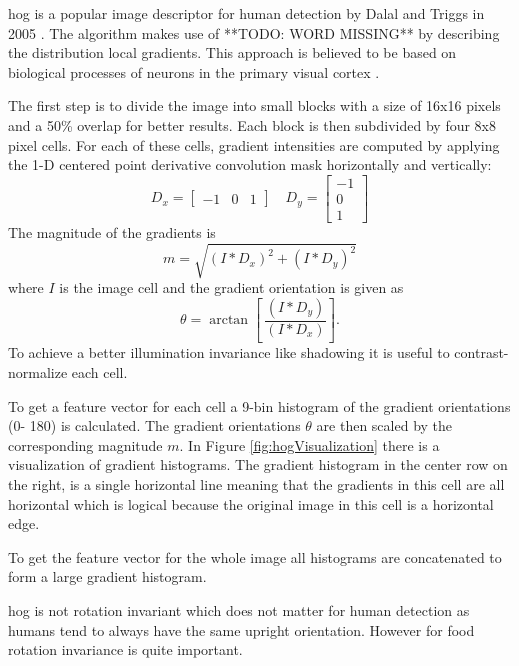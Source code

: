 \acrfull{hog} is a popular image descriptor for human detection by Dalal and Triggs in 2005 \cite{Dalal2005}. The algorithm makes use of **TODO: WORD MISSING** by describing the distribution local gradients. This approach is believed to be based on biological processes of neurons in the primary visual cortex \cite{Lowe2004}.

The first step is to divide the image into small blocks with a size of 16x16 pixels and a 50\% overlap for better results. Each block is then subdivided by four 8x8 pixel cells. For each of these cells, gradient intensities are computed by applying the 1-D centered point derivative convolution mask horizontally and vertically:
\begin{equation}
	D_x=
	\begin{bmatrix}
	-1 & 0 & 1
	\end{bmatrix} 
	\quad
	D_y=
	\begin{bmatrix}
	-1 \\ 0 \\ 1
	\end{bmatrix} 
\end{equation}   
The magnitude of the gradients is
\begin{equation}
	m=\sqrt{(I\ast D_x)^2+(I\ast D_y)^2}
\end{equation}
where $I$ is the image cell and the gradient orientation is given as
\begin{equation}
	\theta = \arctan \left[\ \frac{(I\ast D_y)}{(I\ast D_x)}\right]\text{.}
\end{equation}
To achieve a better illumination invariance like shadowing it is useful to contrast-normalize each cell. 

To get a feature vector for each cell a 9-bin histogram of the gradient orientations {(0\degree - 180\degree)} is calculated. The gradient orientations $\theta$ are then scaled by the corresponding magnitude $m$. In Figure \ref{fig:hogVisualization} there is a visualization of gradient histograms. The gradient histogram in the center row on the right, is a single horizontal line meaning that the gradients in this cell are all horizontal which is logical because the original image in this cell is a horizontal edge.

To get the feature vector for the whole image all histograms are concatenated to form a large gradient histogram.

\gls{hog} is not rotation invariant which does not matter for human detection as humans tend to always have the same upright orientation. However for food rotation invariance is quite important.

